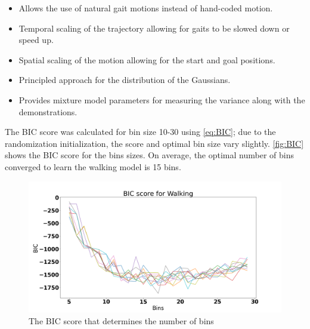 \begin{itemize}
    \item Allows the use of natural gait motions instead of hand-coded motion.
    \item Temporal scaling of the trajectory allowing for gaits to be slowed down or speed up.
    \item Spatial scaling of the motion allowing for the start and goal positions.
    \item Principled approach for the distribution of the Gaussians.
    \item Provides mixture model parameters for measuring the variance along with the demonstrations.
\end{itemize}


The BIC score was calculated for bin size 10-30 using  \autoref{eq:BIC}; due to the randomization initialization, the score and optimal bin size vary slightly. \autoref{fig:BIC} shows the BIC score for the bins sizes. On average, the optimal number of bins converged to learn the walking model is 15 bins.    

\begin{figure}
    \centering
    \includegraphics[scale=0.3]{images/gait_data/BIC_Walk.png}
    \caption[BIC score for walking]{The BIC score that determines the number of bins}
    \label{fig:BIC}
\end{figure}

